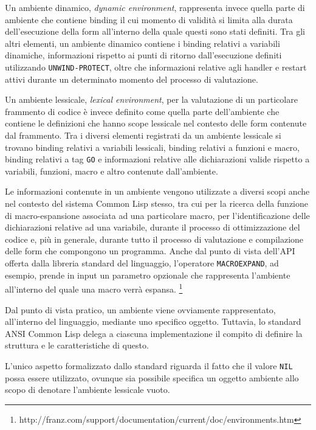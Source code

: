 Un ambiente dinamico, \textit{dynamic environment}, rappresenta invece quella
parte di ambiente che contiene binding il cui momento di validità si limita alla
durata dell'esecuzione della form all'interno della quale questi sono stati
definiti. Tra gli altri elementi, un ambiente dinamico contiene i binding
relativi a variabili dinamiche, informazioni rispetto ai punti di ritorno
dall'esecuzione definiti utilizzando \texttt{UNWIND-PROTECT}, oltre che
informazioni relative agli handler e restart attivi durante un determinato
momento del processo di valutazione.

Un ambiente lessicale, \textit{lexical environment}, per la valutazione di un
particolare frammento di codice è invece definito come quella parte
dell'ambiente che contiene le definizioni che hanno scope lessicale nel contesto
delle form contenute dal frammento. Tra i diversi elementi registrati da un
ambiente lessicale si trovano binding relativi a variabili lessicali, binding
relativi a funzioni e macro, binding relativi a tag \texttt{GO} e informazioni
relative alle dichiarazioni valide rispetto a variabili, funzioni, macro e altro
contenute dall'ambiente.

Le informazioni contenute in un ambiente vengono utilizzate a diversi scopi
anche nel contesto del sistema Common Lisp stesso, tra cui per la ricerca della
funzione di macro-espansione associata ad una particolare macro, per
l'identificazione delle dichiarazioni relative ad una variabile, durante il
processo di ottimizzazione del codice e, più in generale, durante tutto il
processo di valutazione e compilazione delle form che compongono un programma.
Anche dal punto di vista dell'API offerta dalla libreria standard del
linguaggio, l’operatore \texttt{MACROEXPAND}, ad esempio, prende in input un
parametro opzionale che rappresenta l’ambiente all’interno del quale una macro
verrà espansa.
\footnote{http://franz.com/support/documentation/current/doc/environments.htm}

Dal punto di vista pratico, un ambiente viene ovviamente rappresentato,
all'interno del linguaggio, mediante uno specifico oggetto. Tuttavia, lo
standard ANSI Common Lisp delega a ciascuna implementazione il compito di
definire la struttura e le caratteristiche di questo.

L'unico aspetto formalizzato dallo standard riguarda il fatto che il valore
\texttt{NIL} possa essere utilizzato, ovunque sia possibile specifica un oggetto
ambiente allo scopo di denotare l'ambiente lessicale vuoto.

